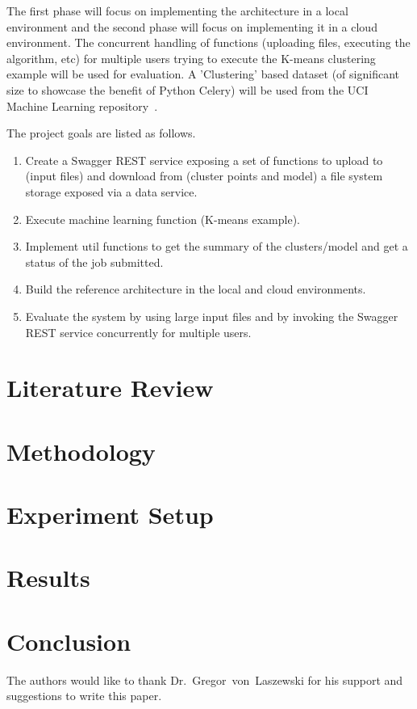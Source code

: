 The first phase will focus on implementing the architecture in a local 
environment and the second phase will focus on implementing it in a cloud 
environment. The concurrent handling of functions (uploading files, executing 
the algorithm, etc) for multiple users trying to execute the K-means clustering 
example will be used for evaluation. A 'Clustering' based dataset (of 
significant size to showcase the benefit of Python Celery) will be used from 
the UCI Machine Learning repository~\cite{hid-sp18-416-www-uci-ml-repository}. 

The project goals are listed as follows.
\begin{enumerate}
	\item Create a Swagger REST service exposing a set of functions to upload 
	to (input files) and download from (cluster points and model) a file system 
	storage exposed via a data service.
	\item Execute machine learning function (K-means example).
	\item Implement util functions to get the summary of the clusters/model and 
	get a status of the job submitted.
	\item Build the reference architecture in the local and cloud environments.
	\item Evaluate the system by using large input files and by invoking the 
	Swagger REST service concurrently for multiple users.
\end{enumerate}

\section{Literature Review}

\section{Methodology}

\section{Experiment Setup}

\section{Results}

\section{Conclusion}


\begin{acks}

  The authors would like to thank Dr.~Gregor~von~Laszewski for his
  support and suggestions to write this paper.

\end{acks}


 

